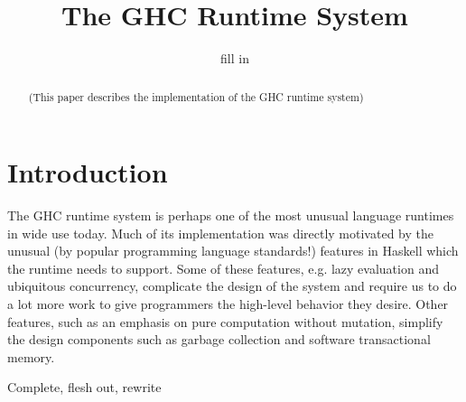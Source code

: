 \documentclass{jfp1}
\title{The GHC Runtime System}
\author{fill in}
\newcommand{\Red}[1]{{\color{red} #1}}
\begin{document}
\maketitle

\begin{abstract}
(This paper describes the implementation of the GHC runtime system)
\end{abstract}

\tableofcontents

\section{Introduction}

The GHC runtime system is perhaps one of the most unusual language
runtimes in wide use today.  Much of its implementation was directly
motivated by the unusual (by popular programming language standards!)
features in Haskell which the runtime needs to support.  Some of these
features, e.g. lazy evaluation and ubiquitous concurrency, complicate
the design of the system and require us to do a lot more work to give
programmers the high-level behavior they desire.  Other features, such
as an emphasis on pure computation without mutation, simplify the design
components such as garbage collection and software transactional memory.

\Red{Complete, flesh out, rewrite}







\end{document}
